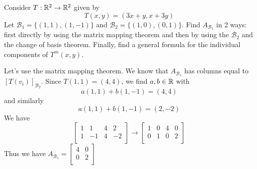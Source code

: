 \documentclass{article}
\begin{document}
\begin{example}
  Consider $T: \mathbb{R}^2 \to \mathbb{R}^2$ given by \[
    T(x, y) = (3x + y, x + 3y)
  \]
  Let $\mathcal{B}_1 = \{(1, 1), (1, -1)\}$ and $\mathcal{B}_2 = \{(1, 0), (0, 1)\}$. Find $A_{\mathcal{B}_1}$ in 2 ways: first directly by using the matrix mapping theorem and then by using the $\mathcal{B}_2$ and the change of basis theorem. Finally, find a general formula for the individual components of $T^m(x, y)$.

  Let's use the matrix mapping theorem. We know that $A_{\mathcal{B}_1}$ has columns equal to $[T(v_i)]_{\mathcal{B}_2}$. Since $T(1, 1) = (4, 4)$, we find $a, b \in \mathbb{R}$ with \[
    a(1, 1) + b(1, -1) = (4, 4)
  \] and similarly \[
    a(1, 1) + b(1, -1) = (2, -2)
  \]
  We have \[
    \left[
      \begin{array}{cc|cc}
        1 & 1  & 4 & 2  \\
        1 & -1 & 4 & -2 \\
      \end{array}\right] \to \left[
      \begin{array}{cc|cc}
        1 & 0 & 4 & 0 \\
        0 & 1 & 0 & 2 \\
      \end{array}\right]
  \]
  Thus we have $A_{\mathcal{B}_1} =
    \begin{bmatrix}
      4 & 0 \\
      0 & 2 \\
    \end{bmatrix}$


\end{example}
\end{document}
